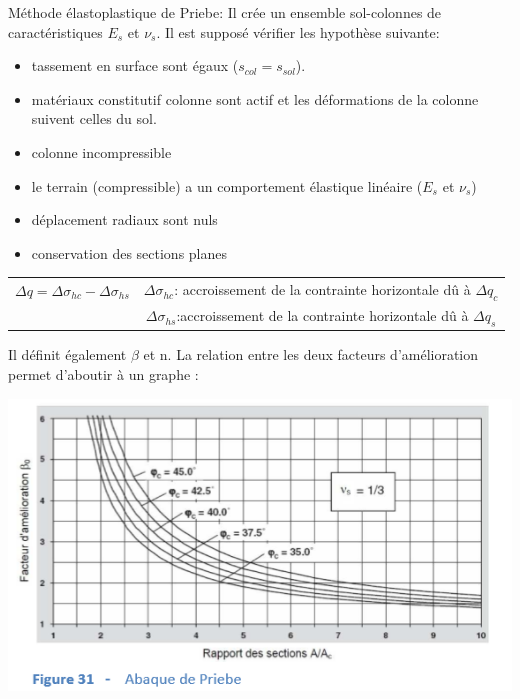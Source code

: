 Méthode élastoplastique de Priebe: Il crée un ensemble sol-colonnes de caractéristiques $E_s$ et $\nu_s$. Il est supposé vérifier les hypothèse suivante:

\begin{itemize}
    \item tassement en surface sont égaux ($s_{col}=s_{sol}$).
    \item matériaux constitutif colonne sont actif et les déformations de la colonne suivent celles du sol.
    \item colonne incompressible
    \item le terrain (compressible) a un comportement élastique linéaire ($E_s$ et $\nu_s$)
    \item déplacement radiaux sont nuls
    \item conservation des sections planes
\end{itemize} 

\medskip

\begin{center}
\begin{tabular}{c|c}
    $\Delta q = \Delta \sigma_{hc} - \Delta \sigma_{hs}$   
            & $\Delta \sigma_{hc}$: accroissement de la contrainte horizontale dû à $\Delta q_c$  \\
            & $\Delta \sigma_{hs}$:accroissement de la contrainte horizontale dû à $\Delta q_s$
\end{tabular}
\end{center}

Il définit également $\beta$ et n. La relation entre les deux facteurs d'amélioration permet d'aboutir à un graphe : 

\begin{center}
\includegraphics [scale=0.5]{pictures/pr.PNG}
\end{center}

